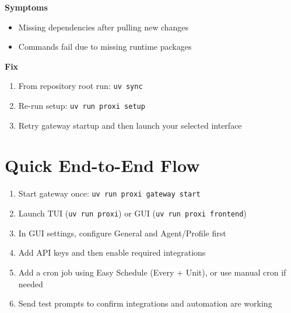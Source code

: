 \documentclass{article}
\begin{document}
\textbf{Symptoms}
\begin{itemize}
\item Missing dependencies after pulling new changes
\item Commands fail due to missing runtime packages
\end{itemize}

\textbf{Fix}
\begin{enumerate}
\item From repository root run: \texttt{uv sync}
\item Re-run setup: \texttt{uv run proxi setup}
\item Retry gateway startup and then launch your selected interface
\end{enumerate}

\section{Quick End-to-End Flow}

\begin{enumerate}
	\item Start gateway once: \texttt{uv run proxi gateway start}
	\item Launch TUI (\texttt{uv run proxi}) or GUI (\texttt{uv run proxi frontend})
	\item In GUI settings, configure General and Agent/Profile first
	\item Add API keys and then enable required integrations
	\item Add a cron job using Easy Schedule (Every + Unit), or use manual cron if needed
	\item Send test prompts to confirm integrations and automation are working
\end{enumerate}
\end{document}
